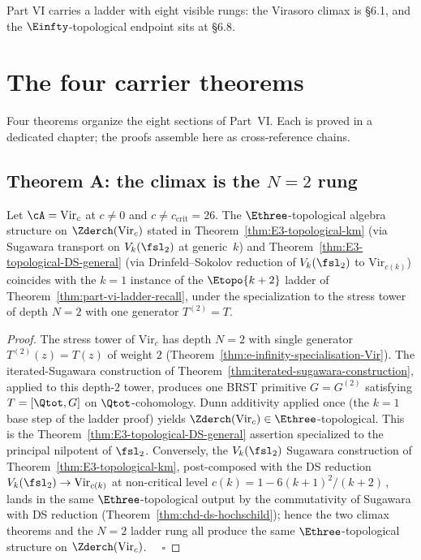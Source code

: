 Part VI carries a ladder with eight visible rungs: the Virasoro
climax is \S6.1, and the $\Einfty$-topological endpoint sits at \S6.8.

\section{The four carrier theorems}
\label{sec:part-vi-four-theorems}

Four theorems organize the eight sections of Part~VI.
Each is proved in a dedicated chapter; the proofs assemble here as
cross-reference chains.

\subsection{Theorem A: the climax is the $N=2$ rung}
\label{sec:part-vi-theorem-A}

\begin{theorem}[Part~VI climax is the $N=2$ rung of the iterated-Sugawara
 ladder; \ClaimStatusProvedHere]
\label{thm:part-vi-e3-climax-is-N2-rung}
Let $\cA = \mathrm{Vir}_c$ at $c \ne 0$ and $c \ne c_{\mathrm{crit}} = 26$.
The $\Ethree$-topological algebra structure on $\Zderch(\mathrm{Vir}_c)$
stated in Theorem~\ref{thm:E3-topological-km} \textup{(}via Sugawara
transport on $V_k(\fsl_2)$ at generic~$k$\textup{)} and
Theorem~\ref{thm:E3-topological-DS-general} \textup{(}via
Drinfeld--Sokolov reduction of $V_k(\fsl_2)$ to $\mathrm{Vir}_{c(k)}$\textup{)}
coincides with the $k=1$ instance of the $\Etopo{k+2}$ ladder of
Theorem~\ref{thm:part-vi-ladder-recall}, under the specialization to
the stress tower of depth $N=2$ with one generator $T^{(2)} = T$.
\end{theorem}
\begin{proof}
The stress tower of $\mathrm{Vir}_c$ has depth $N=2$ with single
generator $T^{(2)}(z) = T(z)$ of weight $2$
(Theorem~\ref{thm:e-infinity-specialisation-Vir}). The
iterated-Sugawara construction of
Theorem~\ref{thm:iterated-sugawara-construction}, applied to this
depth-$2$ tower, produces one BRST primitive $G = G^{(2)}$ satisfying
$T = [\Qtot, G]$ on $\Qtot$-cohomology. Dunn additivity applied once
(the $k=1$ base step of the ladder proof) yields $\Zderch(\mathrm{Vir}_c) \in
\Ethree$-topological. This is the
Theorem~\ref{thm:E3-topological-DS-general} assertion specialized to
the principal nilpotent of $\fsl_2$. Conversely, the $V_k(\fsl_2)$
Sugawara construction of Theorem~\ref{thm:E3-topological-km},
post-composed with the DS reduction
$V_k(\fsl_2) \to \mathrm{Vir}_{c(k)}$ at non-critical level
$c(k) = 1 - 6(k+1)^2/(k+2)$\,\cite{FeiginFrenkel}, lands in the same
$\Ethree$-topological output by the commutativity of Sugawara with DS
reduction (Theorem~\ref{thm:chd-ds-hochschild}); hence the two climax
theorems and the $N=2$ ladder rung all produce the same
$\Ethree$-topological structure on $\Zderch(\mathrm{Vir}_c)$. $\quad\square$
\end{proof}

